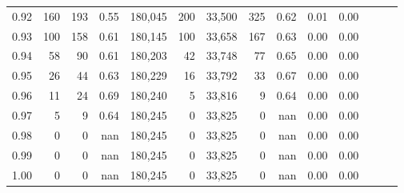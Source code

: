 \begin{tabular}{rrrrrrrrrrrrrr}
0.92 &    160 &  193 &  0.55 &  180,045 &      200 &  33,500 &     325 &  0.62 &  0.01 &      0.00 \\
0.93 &    100 &  158 &  0.61 &  180,145 &      100 &  33,658 &     167 &  0.63 &  0.00 &      0.00 \\
0.94 &     58 &   90 &  0.61 &  180,203 &       42 &  33,748 &      77 &  0.65 &  0.00 &      0.00 \\
0.95 &     26 &   44 &  0.63 &  180,229 &       16 &  33,792 &      33 &  0.67 &  0.00 &      0.00 \\
0.96 &     11 &   24 &  0.69 &  180,240 &        5 &  33,816 &       9 &  0.64 &  0.00 &      0.00 \\
0.97 &      5 &    9 &  0.64 &  180,245 &        0 &  33,825 &       0 &   nan &  0.00 &      0.00 \\
0.98 &      0 &    0 &   nan &  180,245 &        0 &  33,825 &       0 &   nan &  0.00 &      0.00 \\
0.99 &      0 &    0 &   nan &  180,245 &        0 &  33,825 &       0 &   nan &  0.00 &      0.00 \\
1.00 &      0 &    0 &   nan &  180,245 &        0 &  33,825 &       0 &   nan &  0.00 &      0.00 \\
\bottomrule
\end{tabular}
